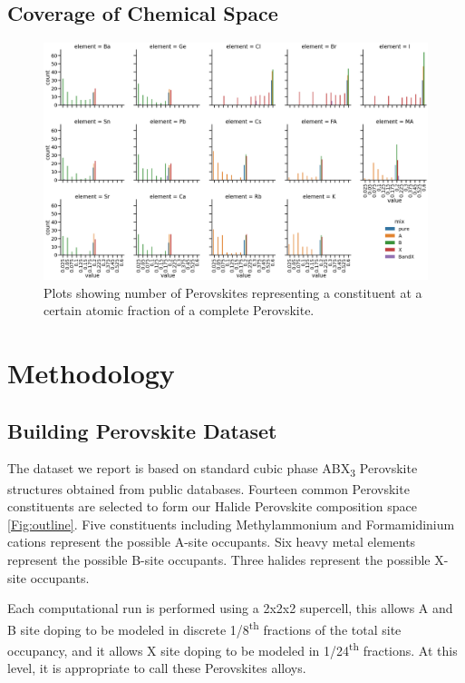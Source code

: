 \documentclass[twoside, twocolumn, 9pt, draft]{article}
\begin{document}
\subsection*{Coverage of Chemical Space}
\label{sec:org1622a81}

\begin{figure}
\centering
\includegraphics[width=.9\linewidth]{variability_of_composition_vectors.png}
\caption{\label{fig:chemspace_uni} Plots showing number of Perovskites representing a constituent at a certain atomic fraction of a complete Perovskite.}
\end{figure}

\section*{Methodology}
\label{sec:org5a0216f}
\subsection*{Building Perovskite Dataset}
\label{sec:org0ad8451}
The dataset we report is based on standard cubic phase ABX\textsubscript{3}
Perovskite structures obtained from public databases. Fourteen common
Perovskite constituents are selected to form our Halide Perovskite
composition space \ref{Fig:outline}. Five constituents including
Methylammonium and Formamidinium cations represent the possible A-site
occupants. Six heavy metal elements represent the possible B-site
occupants. Three halides represent the possible X-site occupants.

Each computational run is performed using a 2x2x2 supercell, this
allows A and B site doping to be modeled in discrete 1/8\textsuperscript{th} fractions
of the total site occupancy, and it allows X site doping to be modeled
in 1/24\textsuperscript{th} fractions. At this level, it is appropriate to call these
Perovskites alloys.
\end{document}
